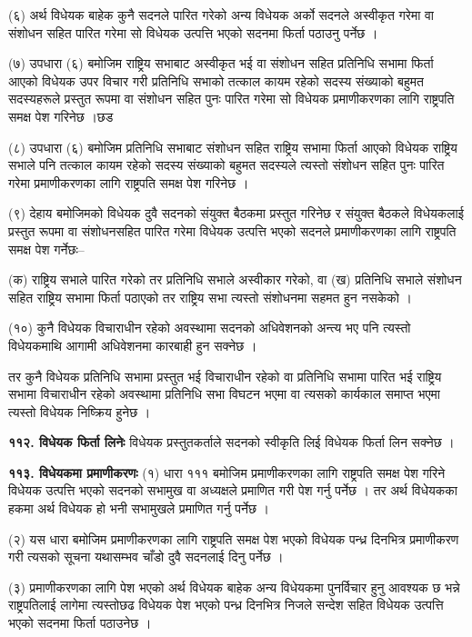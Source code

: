 (६) अर्थ विधेयक बाहेक कुनै सदनले पारित गरेको अन्य विधेयक अर्को सदनले अस्वीकृत गरेमा वा संशोधन सहित पारित गरेमा सो विधेयक उत्पत्ति भएको सदनमा फिर्ता पठाउनु पर्नेछ ।

(७) उपधारा (६) बमोजिम राष्ट्रिय सभाबाट अस्वीकृत भई वा संशोधन सहित प्रतिनिधि सभामा फिर्ता आएको विधेयक उपर विचार गरी प्रतिनिधि सभाको तत्काल कायम रहेको सदस्य संख्याको बहुमत सदस्यहरूले प्रस्तुत रूपमा वा संशोधन सहित पुनः पारित गरेमा सो विधेयक प्रमाणीकरणका लागि राष्ट्रपति समक्ष पेश गरिनेछ ।छड

(८) उपधारा (६) बमोजिम प्रतिनिधि सभाबाट संशोधन सहित राष्ट्रिय सभामा फिर्ता आएको विधेयक राष्ट्रिय सभाले पनि तत्काल कायम रहेको सदस्य संख्याको बहुमत सदस्यले त्यस्तो संशोधन सहित पुनः पारित गरेमा प्रमाणीकरणका लागि राष्ट्रपति समक्ष पेश गरिनेछ ।

(९) देहाय बमोजिमको विधेयक दुवै सदनको संयुक्त बैठकमा प्रस्तुत गरिनेछ र संयुक्त बैठकले विधेयकलाई प्रस्तुत रूपमा वा संशोधनसहित पारित गरेमा विधेयक उत्पत्ति भएको सदनले प्रमाणीकरणका लागि राष्ट्रपति समक्ष पेश गर्नेछः–

(क) राष्ट्रिय सभाले पारित गरेको तर प्रतिनिधि सभाले अस्वीकार गरेको, वा
(ख) प्रतिनिधि सभाले संशोधन सहित राष्ट्रिय सभामा फिर्ता पठाएको तर राष्ट्रिय सभा त्यस्तो संशोधनमा सहमत हुन नसकेको ।

(१०) कुनै विधेयक विचाराधीन रहेको अवस्थामा सदनको अधिवेशनको अन्त्य भए पनि त्यस्तो विधेयकमाथि आगामी अधिवेशनमा कारबाही हुन सक्नेछ ।

तर कुनै विधेयक प्रतिनिधि सभामा प्रस्तुत भई विचाराधीन रहेको वा प्रतिनिधि सभामा पारित भई राष्ट्रिय सभामा विचाराधीन रहेको अवस्थामा प्रतिनिधि सभा विघटन भएमा वा त्यसको कार्यकाल समाप्त भएमा त्यस्तो विधेयक निष्क्रिय हुनेछ ।

\textbf{११२. विधेयक फिर्ता लिनेः} विधेयक प्रस्तुतकर्ताले सदनको स्वीकृति लिई विधेयक फिर्ता लिन सक्नेछ ।

\textbf{११३. विधेयकमा प्रमाणीकरणः} (१) धारा १११ बमोजिम प्रमाणीकरणका लागि राष्ट्रपति समक्ष पेश गरिने विधेयक उत्पत्ति भएको सदनको सभामुख वा अध्यक्षले प्रमाणित गरी पेश गर्नु पर्नेछ । तर अर्थ विधेयकका हकमा अर्थ विधेयक हो भनी सभामुखले प्रमाणित गर्नु पर्नेछ ।

(२) यस धारा बमोजिम प्रमाणीकरणका लागि राष्ट्रपति समक्ष पेश भएको विधेयक पन्ध्र दिनभित्र प्रमाणीकरण गरी त्यसको सूचना यथासम्भव चाँडो दुवै सदनलाई दिनु पर्नेछ ।

(३) प्रमाणीकरणका लागि पेश भएको अर्थ विधेयक बाहेक अन्य विधेयकमा पुनर्विचार हुनु आवश्यक छ भन्ने राष्ट्रपतिलाई लागेमा त्यस्तोछढ विधेयक पेश भएको पन्ध्र दिनभित्र निजले सन्देश सहित विधेयक उत्पत्ति भएको सदनमा फिर्ता पठाउनेछ ।

